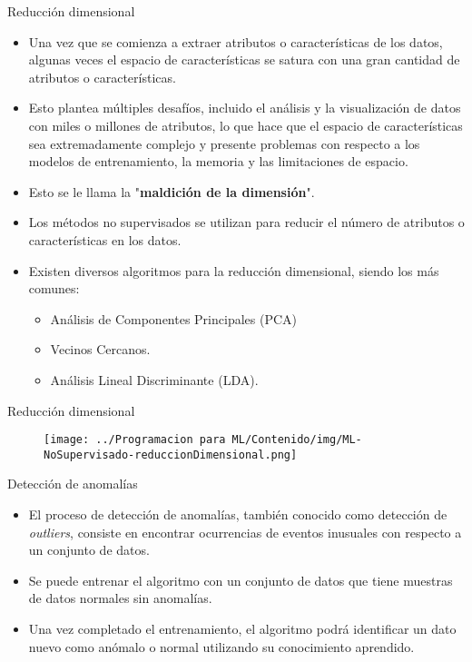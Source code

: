 \documentclass[11pt,aspectratio=169]{beamer}
\begin{document}
\begin{frame}{Reducción dimensional}
\begin{itemize}
	\item Una vez que se comienza a extraer atributos o características de los datos, algunas veces el espacio de
		características se satura con una gran cantidad de atributos o características. \pause
	\item Esto plantea múltiples desafíos, incluido el análisis y la visualización de datos con miles o millones de atributos, 
		lo que hace que el espacio de características sea extremadamente complejo y presente problemas con respecto a los modelos de 
		entrenamiento, la memoria y las limitaciones de espacio.\pause 
	\item Esto se le llama la "\textbf{maldición de la dimensión}".\pause
	\item Los métodos no supervisados se utilizan para reducir el número de atributos o características en los datos. \pause
	\item Existen diversos algoritmos para la reducción dimensional, siendo los más comunes:\pause
		\begin{itemize}
			\item Análisis de Componentes Principales (PCA)\pause
			\item Vecinos Cercanos.\pause
			\item Análisis Lineal Discriminante (LDA).
		\end{itemize}
\end{itemize}
\end{frame}

\begin{frame}{Reducción dimensional}
\begin{figure}[H]
	\centering
	\texttt{[image: ../Programacion para ML/Contenido/img/ML-NoSupervisado-reduccionDimensional.png]}
\end{figure}
\end{frame}

\begin{frame}{Detección de anomalías}
\begin{itemize}
	\item El proceso de detección de anomalías, también conocido como detección de \textit{outliers}, consiste en 
		encontrar ocurrencias de eventos inusuales con respecto a un conjunto de datos. \pause
	\item Se puede entrenar el algoritmo con un conjunto de datos que tiene muestras de datos normales sin anomalías.\pause 
	\item Una vez completado el entrenamiento, el algoritmo podrá identificar un dato nuevo como anómalo o normal utilizando 
		su conocimiento aprendido.\pause
\end{itemize}
\end{frame}
\end{document}
